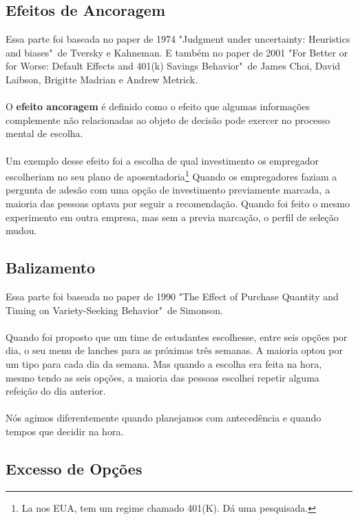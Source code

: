 \documentclass[a4paper,11pt,oneside]{book}
\theoremstyle{definition}
\theoremstyle{break}
\begin{document}
\subsection{Efeitos de Ancoragem}

Essa parte foi baseada no paper de 1974 "Judgment under uncertainty: Heuristics and biases"\ de Tversky e Kahneman. E também no paper de 2001 "For Better or for Worse: Default Effects and 401(k) Savings Behavior"\ de James Choi, David Laibson, Brigitte Madrian e Andrew Metrick.
\\
\\
O \textbf{efeito ancoragem} é definido como o efeito que algumas informações complemente não relacionadas ao objeto de decisão pode exercer no processo mental de escolha.
\\
\\
Um exemplo desse efeito foi a escolha de qual investimento os empregador escolheriam no seu plano de aposentadoria\footnote{La nos EUA, tem um regime chamado 401(K). Dá uma pesquisada.} Quando os empregadores faziam a pergunta de adesão com uma opção de investimento previamente marcada, a maioria das pessoas optava por seguir a recomendação. Quando foi feito o mesmo experimento em outra empresa, mas sem a previa marcação, o perfil de seleção mudou.

\subsection{Balizamento}

Essa parte foi baseada no paper de 1990 "The Effect of Purchase Quantity and Timing on Variety-Seeking Behavior"\ de Simonson.
\\
\\
Quando foi proposto que um time de estudantes escolhesse, entre seis opções por dia, o seu menu de lanches para as próximas três semanas. A maioria optou por um tipo para cada dia da semana. Mas quando a escolha era feita na hora, mesmo tendo as seis opções, a maioria das pessoas escolhei repetir alguma refeição do dia anterior.
\\
\\
Nós agimos diferentemente quando planejamos com antecedência e quando tempos que decidir na hora.

\subsection{Excesso de Opções}
\end{document}
